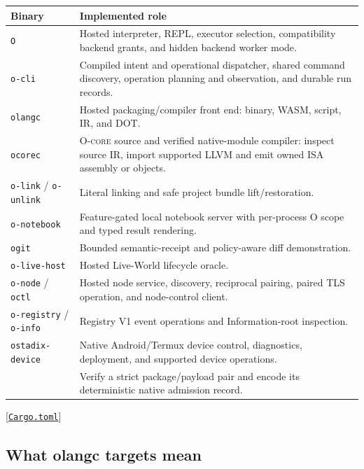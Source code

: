 \documentclass[11pt,oneside]{article}
\newcommand{\ocore}{{\mdseries\textsc{O-core}}}
\newcommand{\src}[1]{\textcolor{OSlate}{\scriptsize[\href{https://github.com/lostadi/OSTADIX/blob/c0b02c326b2329a95ba52447c7180bc93957cd57/#1}{\nolinkurl{#1}}]}\allowbreak}
\begin{document}
\begin{longtable}{P{0.32\textwidth} P{0.60\textwidth}}
\toprule
\textbf{Binary} & \textbf{Implemented role} \\
\midrule
\endhead
\texttt{O} &
Hosted interpreter, REPL, executor selection, compatibility backend grants,
and hidden backend worker mode. \\
\texttt{o-cli} &
Compiled intent and operational dispatcher, shared command discovery,
operation planning and observation, and durable run records. \\
\texttt{olangc} &
Hosted packaging/compiler front end: binary, WASM, script, IR, and DOT. \\
\texttt{ocorec} &
\ocore{} source and verified native-module compiler: inspect source IR, import supported LLVM and emit owned ISA assembly or objects. \\
\texttt{o-link} / \texttt{o-unlink} &
Literal linking and safe project bundle lift/restoration. \\
\texttt{o-notebook} &
Feature-gated local notebook server with per-process O scope and typed result
rendering. \\
\texttt{ogit} &
Bounded semantic-receipt and policy-aware diff demonstration. \\
\texttt{o-live-host} &
Hosted Live-World lifecycle oracle. \\
\texttt{o-node} / \texttt{octl} &
Hosted node service, discovery, reciprocal pairing, paired TLS operation, and
node-control client. \\
\texttt{o-registry} / \texttt{o-info} &
Registry V1 event operations and Information-root inspection. \\
\texttt{ostadix-device} & Native Android/Termux device control, diagnostics,
deployment, and supported device operations. \\
 &
Verify a strict package/payload pair and encode its deterministic native
admission record. \\
\bottomrule
\end{longtable}

\src{Cargo.toml}

\subsection{What olangc targets mean}
\end{document}
